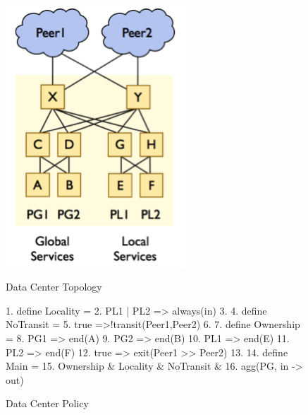 \begin{figure}[t]
    \centering
    \begin{minipage}{.5\textwidth}
        \centering
        \includegraphics[width=0.6\textwidth]{figures/datacenter-topo}
        \caption{Data Center Topology}
        \label{fig:data-center-topo}
    \end{minipage}%
    \begin{minipage}{0.5\textwidth}
        \centering
\begin{mylisting}
 1. define Locality = 
 2.   {PL1 | PL2 => always(in)}
 3. 
 4. define NoTransit = 
 5.  {true =>!transit({Peer1,Peer2})}
 6.
 7. define Ownership = 
 8.  {PG1   => end(A)
 9.   PG2   => end(B)
10.   PL1   => end(E)
11.   PL2   => end(F)
12.   true => exit(Peer1 >> Peer2)}
13.
14. define Main =
15.   Ownership & Locality & NoTransit & 
16.   agg(PG, in -> out)
\end{mylisting}
        \caption{Data Center Policy}
        \label{fig:policy}
    \end{minipage}
\end{figure}

